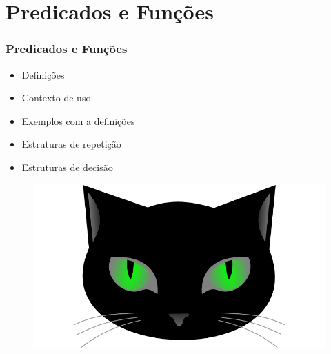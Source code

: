 \section{Predicados e Funções}


\begin{frame}
\frametitle{Predicados e Funções}
\begin{minipage}{0.47\textwidth}
    \begin{itemize}
        \item Definições
        \item Contexto de uso
        \item Exemplos com a definições
        \item Estruturas de repetição
        \item Estruturas de decisão
    \end{itemize}
\end{minipage}
\begin{minipage}{0.5\textwidth}
\begin{figure}[ht!]
\begin{center}
\includegraphics[width=1.2\textwidth, height=0.40\textheight]{figures/logo_picat_alex.jpg}
\end{center}
\end{figure}
\end{minipage}
\end{frame}


